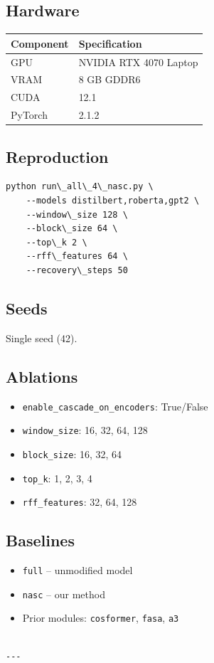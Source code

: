 \subsection{Hardware}

\begin{table}[H]
\centering
\small
\begin{tabular}{ll}
\toprule
\textbf{Component} & \textbf{Specification} \\
\midrule
GPU & NVIDIA RTX 4070 Laptop \\
VRAM & 8 GB GDDR6 \\
CUDA & 12.1 \\
PyTorch & 2.1.2 \\
\bottomrule
\end{tabular}
\end{table}

\subsection{Reproduction}

\begin{lstlisting}
python run\_all\_4\_nasc.py \
    --models distilbert,roberta,gpt2 \
    --window\_size 128 \
    --block\_size 64 \
    --top\_k 2 \
    --rff\_features 64 \
    --recovery\_steps 50
\end{lstlisting}

\subsection{Seeds}

Single seed (42).

\subsection{Ablations}

\begin{itemize}
\item \texttt{enable\_cascade\_on\_encoders}: True/False
\item \texttt{window\_size}: 16, 32, 64, 128
\item \texttt{block\_size}: 16, 32, 64
\item \texttt{top\_k}: 1, 2, 3, 4
\item \texttt{rff\_features}: 32, 64, 128

\end{itemize}
\subsection{Baselines}

\begin{itemize}
\item \texttt{full} -- unmodified model
\item \texttt{nasc} -- our method
\item Prior modules: \texttt{cosformer}, \texttt{fasa}, \texttt{a3}
\end{itemize}
\begin{lstlisting}

---
\end{lstlisting}